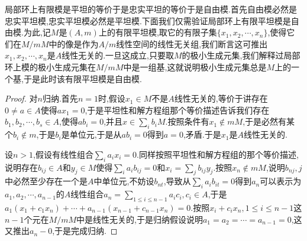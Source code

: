 局部环上有限模是平坦的等价于是忠实平坦的等价于是自由模.首先自由模必然是忠实平坦模,忠实平坦模必然是平坦模.下面我们仅需验证局部环上有限平坦模是自由模.为此,记$M$是$(A,m)$上的有限平坦模,取它的有限子集$\{x_1,x_2,\cdots,x_n\}$,使得它们在$M/mM$中的像是作为$A/m$线性空间的线性无关组,我们断言这可推出$x_1,x_2,\cdots,x_n$是$A$线性无关的.一旦这成立,只要取$M$的极小生成元集,我们解释过局部环上模的极小生成元集在$M/mM$中是一组基,这就说明极小生成元集总是$M$上的一个基,于是此时该有限平坦模是自由模.
\begin{proof}
	
	对$n$归纳.首先$n=1$时,假设$x_1\in M$不是$A$线性无关的,等价于讲存在$0\not=a\in A$使得$ax_1=0$,于是平坦性和解方程组那个等价描述告诉我们存在$b_1,b_2,\cdots,b_s\in A$,使得$ab_i=0$,并且$x\in\sum_ib_iM$.按照条件有$x_1\not\in mM$,于是必然有某个$b_i\not\in m$,于是$b_i$是单位元,于是从$ab_i=0$得到$a=0$,矛盾.于是$x_1$是$A$线性无关的.
	
	设$n>1$,假设有线性组合$\sum_ia_ix_i=0$.同样按照平坦性和解方程组的那个等价描述,说明存在$b_{ij}\in A$和$y_j\in M$使得$\sum_ia_ib_{ij}=0$和$x_i=\sum_jb_{ij}y_j$.按照$x_n\not\in mM$,说明$b_{nj},j$中必然至少存在一个是$A$中单位元,不妨设$b_{nt}$,导致从$\sum_ia_ib_{it}=0$得到$a_n$可以表示为$a_1,a_2,\cdots,a_{n-1}$的$A$线性组合$a_n=\sum_{1\le i\le n-1}a_ic_i,c_i\in A$,于是$a_1(x_1+c_1x_n)+\cdots+a_{n-1}(x_{n-1}+c_{n-1}x_n)=0$.按照$x_i+c_ix_n,1\le i\le n-1$这$n-1$个元在$M/mM$中是线性无关的,于是归纳假设说明$a_1=a_2=\cdots=a_{n-1}=0$,这又推出$a_n-0$,于是完成归纳.
\end{proof}

